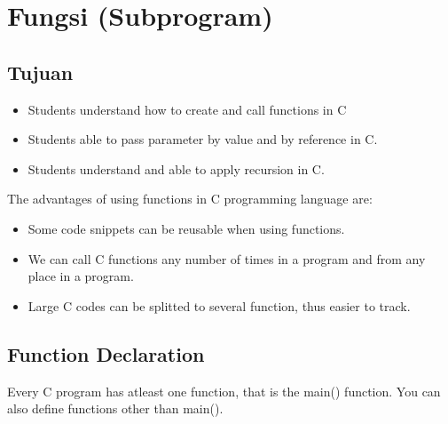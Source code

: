 \chapter{Fungsi (Subprogram)}
\section{Tujuan}
\begin{itemize}
    \item Students understand how to create and call functions in C %
    \item Students able to pass parameter by value and by reference in C.%
    \item Students understand and able to apply recursion in C. %
    
\end{itemize}   

The advantages of using functions in C programming language are:
\begin{itemize}
	\item Some code snippets can be reusable when using functions. 
\item We can call C functions any number of times in a program and from any place in a program.
\item Large C codes can be splitted to several function, thus easier to track.%
\end{itemize}
\section{Function Declaration}
 Every C program has atleast one function, that is the main() function. You can also define functions other than main().
 
